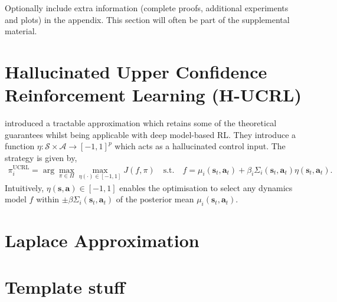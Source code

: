 \documentclass{article}
\newcommand{\state}{\ensuremath{\mathbf{s}}}
\newcommand{\action}{\ensuremath{\mathbf{a}}}
\newcommand{\policyDomain}{\ensuremath{\Pi}}
\newcommand{\transitionFn}{\ensuremath{f}}
\newcommand{\policy}{\ensuremath{\pi}}
\begin{document}
Optionally include extra information (complete proofs, additional experiments and plots) in the appendix.
This section will often be part of the supplemental material.




\section{Hallucinated Upper Confidence Reinforcement Learning (H-UCRL)} \label{sec-hucrl}
\cite{curiEfficient2020} introduced a tractable approximation which retains some of the theoretical guarantees whilst
being applicable with deep model-based RL.
They introduce a function \(\eta: \mathcal{S} \times \mathcal{A} \rightarrow [-1, 1]^{p}\) which acts as a hallucinated control input.
The strategy is given by,
\begin{align} \label{eq-hucrl}
\pi_i^{\text{UCRL}} = \arg \max_{\policy \in \policyDomain} \max_{\eta(\cdot) \in [-1,1]} J(\transitionFn, \policy) \quad \text{s.t.} \quad \transitionFn = \mu_{i}(\state_{t}, \action_{t}) + \beta_{i} \Sigma_{i}(\state_{t}, \action_{t}) \eta(\state_{t},\action_{t}).
\end{align}
Intuitively, \(\eta(\state,\action) \in [-1,1]\) enables the optimisation to select any dynamics model
\(\transitionFn\) within \(\pm \beta \Sigma_{i}(\state_{t}, \action_{t})\) of the posterior mean \(\mu_{i}(\state_{t}, \action_{t})\).

\section{Laplace Approximation} \label{sec-laplace-approximation}


\section{Template stuff}
\end{document}
